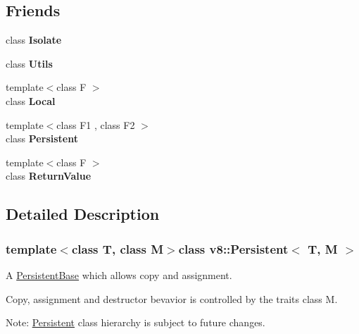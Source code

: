 \subsection*{Friends}
\begin{DoxyCompactItemize}
\item 
\hypertarget{classv8_1_1_persistent_aba4f0964bdacf2bbf62cf876e5d28d0a}{}class {\bfseries Isolate}\label{classv8_1_1_persistent_aba4f0964bdacf2bbf62cf876e5d28d0a}

\item 
\hypertarget{classv8_1_1_persistent_abc0f7da619e9e72510dc07ed7b5ff6d8}{}class {\bfseries Utils}\label{classv8_1_1_persistent_abc0f7da619e9e72510dc07ed7b5ff6d8}

\item 
\hypertarget{classv8_1_1_persistent_afb872edb4aac7ba55f0da004113aa2b0}{}{\footnotesize template$<$class F $>$ }\\class {\bfseries Local}\label{classv8_1_1_persistent_afb872edb4aac7ba55f0da004113aa2b0}

\item 
\hypertarget{classv8_1_1_persistent_ad845ec8872174be0a9ca9a3dd1898d30}{}{\footnotesize template$<$class F1 , class F2 $>$ }\\class {\bfseries Persistent}\label{classv8_1_1_persistent_ad845ec8872174be0a9ca9a3dd1898d30}

\item 
\hypertarget{classv8_1_1_persistent_a53f604d3d6f2dc0647df33c9979f116a}{}{\footnotesize template$<$class F $>$ }\\class {\bfseries Return\+Value}\label{classv8_1_1_persistent_a53f604d3d6f2dc0647df33c9979f116a}

\end{DoxyCompactItemize}


\subsection{Detailed Description}
\subsubsection*{template$<$class T, class M$>$class v8\+::\+Persistent$<$ T, M $>$}

A \hyperlink{classv8_1_1_persistent_base}{Persistent\+Base} which allows copy and assignment.

Copy, assignment and destructor bevavior is controlled by the traits class M.

Note\+: \hyperlink{classv8_1_1_persistent}{Persistent} class hierarchy is subject to future changes. 

